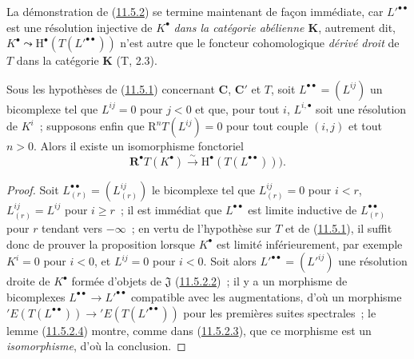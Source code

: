 \begin{env}[11.5.2.5]
\label{0.11.5.2.5-fr}
La démonstration de (\hyperref[0.11.5.2-fr]{11.5.2}) se termine maintenant de
façon immédiate, car $L'^{\bullet\bullet}$ est une résolution injective de
$K^\bullet$ \emph{dans la catégorie abélienne $\boldsymbol{K}$}, autrement dit,
$K^\bullet\leadsto\mathrm H^\bullet(T(L'^{\bullet\bullet}))$ n'est autre que
le foncteur cohomologique \emph{dérivé droit} de $T$ dans la catégorie $\boldsymbol{K}$
(T, 2.3).
\end{env}

\begin{proposition}[11.5.3]
\label{0.11.5.3-fr}
Sous les hypothèses de \textup{(\hyperref[0.11.5.1-fr]{11.5.1})} concernant
$\boldsymbol{C}$, $\boldsymbol{C}'$ et $T$, soit
$L^{\bullet\bullet}=(L^{ij})$ un bicomplexe tel que $L^{ij}=0$ pour $j<0$ et
que, pour tout $i$, $L^{i,\bullet}$ soit une résolution de $K^i$~; supposons
enfin que $\mathrm R^nT(L^{ij})=0$ pour tout couple $(i,j)$ et tout $n>0$.
Alors il existe un isomorphisme fonctoriel
\[
  \label{0.11.5.3.1-fr}
  \mathbf R^\bullet T(K^\bullet)\xrightarrow{\sim}
  \mathrm H^\bullet(T(L^{\bullet\bullet}))).
  \tag{11.5.3.1}
\]
\end{proposition}

\begin{proof}
Soit $L_{(r)}^{\bullet\bullet}=(L_{(r)}^{ij})$ le bicomplexe tel que
$L_{(r)}^{ij}=0$ pour $i<r$, $L_{(r)}^{ij}=L^{ij}$ pour $i\geq r$~; il est
immédiat que $L^{\bullet\bullet}$ est limite inductive de
$L_{(r)}^{\bullet\bullet}$ pour $r$ tendant vers $-\infty$~; en vertu de
l'hypothèse sur $T$ et de (\hyperref[0.11.5.1-fr]{11.5.1}), il suffit donc de
prouver la proposition lorsque $K^\bullet$ est limité inférieurement, par
exemple $K^i=0$ pour $i<0$, et $L^{ij}=0$ pour $i<0$. Soit alors
$L'^{\bullet\bullet}=(L'^{ij})$ une résolution droite de $K^\bullet$ formée
d'objets de $\mathfrak J$ (\hyperref[0.11.5.2.2-fr]{11.5.2.2})~; il y a un
morphisme de bicomplexes
$L^{\bullet\bullet}\to L'^{\bullet\bullet}$ compatible avec les
augmentations, d'où un morphisme
$'E(T(L^{\bullet\bullet}))\to{}'E(T(L'^{\bullet\bullet}))$ pour les premières
suites spectrales~; le lemme (\hyperref[0.11.5.2.4-fr]{11.5.2.4}) montre,
comme dans (\hyperref[0.11.5.2.3-fr]{11.5.2.3}), que ce morphisme est un
\emph{isomorphisme}, d'où la conclusion.
\end{proof}

